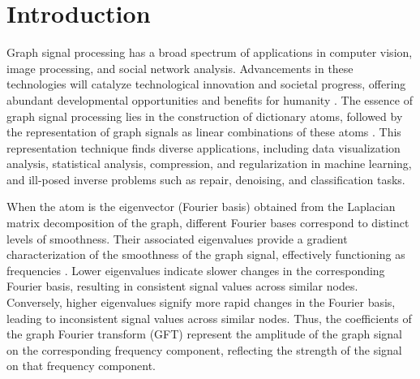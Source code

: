 \documentclass[lettersize,journal]{IEEEtran}
\begin{document}
\section{Introduction} \label{sec1}
Graph signal processing has a broad spectrum of applications in computer vision, image processing, and social network analysis. Advancements in these technologies will catalyze technological innovation and societal progress, offering abundant developmental opportunities and benefits for humanity \cite{sandryhaila2014big, sandryhaila2013discrete, ortega2018graph}.
The essence of graph signal processing lies in the construction of dictionary atoms, followed by the representation of graph signals as linear combinations of these atoms \cite{shuman2020localized}. This representation technique finds diverse applications, including data visualization analysis, statistical analysis, compression, and regularization in machine learning, and ill-posed inverse problems such as repair, denoising, and classification tasks. 

When the atom is the eigenvector (Fourier basis) obtained from the Laplacian matrix decomposition of the graph, different Fourier bases correspond to distinct levels of smoothness. Their associated eigenvalues provide a gradient characterization of the smoothness of the graph signal, effectively functioning as frequencies \cite{shuman2013emmerging, sandryhaila2014discrete}. Lower eigenvalues indicate slower changes in the corresponding Fourier basis, resulting in consistent signal values across similar nodes. Conversely, higher eigenvalues signify more rapid changes in the Fourier basis, leading to inconsistent signal values across similar nodes. Thus, the coefficients of the graph Fourier transform (GFT) represent the amplitude of the graph signal on the corresponding frequency component, reflecting the strength of the signal on that frequency component. 
\end{document}
